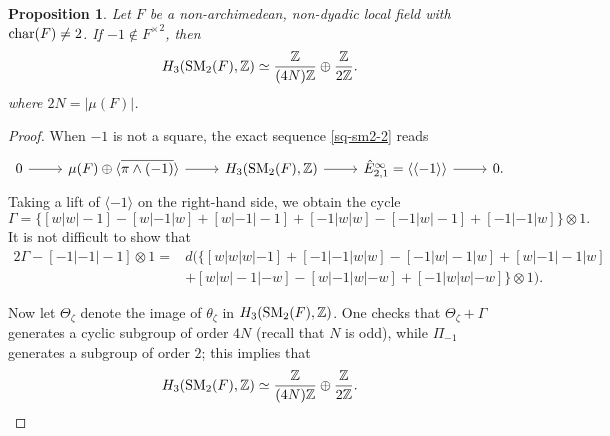 \documentclass[11pt]{amsart}
\theoremstyle{definition}
\theoremstyle{plain}
\newtheorem{prp}[ntn]{Proposition}
\theoremstyle{definition}
\numberwithin{equation}{section}
\newcommand{\z}{\mathbb{Z}}
\newcommand{\lan}{\langle}
\newcommand{\ran}{\rangle}
\newcommand{\SM}{\mathit{{\rm SM}}}
\renewcommand{\char}{{\rm char}}
\begin{document}
	\begin{prp}
		Let $F$ be a non-archimedean, non-dyadic local field with $\char(F)\neq 2$. If $-1\notin{F^\times}^2$, then
		\[
		H_3(\SM_2(F),\z)\simeq \frac{\z}{(4N)\z}\oplus\frac{\z}{2\z}. 
		\]
		where $2N=|\mu(F)|$.
	\end{prp}
	\begin{proof}
		When $-1$ is not a square, the exact sequence \eqref{sq-sm2-2} reads
		\[
		\begin{tikzcd}
			0 \ar[r]& \mu(F)\oplus\lan\overline{\pi\wedge(-1)}\ran\ar[r] & H_3(\SM_2(F),\z)\ar[r] & \hat{E}^{\infty}_{2,1}=\lan\lan -1\ran\ran\ar[r] & 0.
		\end{tikzcd}
		\]
		Taking a lift of $\lan -1\ran$ on the right-hand side, we obtain the cycle
		\[
		\Gamma = \{[w|w|-1]-[w|-1|w]+[w|-1|-1]+[-1|w|w]-[-1|w|-1]+[-1|-1|w]\}\otimes 1.
		\]
		It is not difficult to show that
		\begin{align*}
			2\Gamma-[-1|-1|-1]\otimes 1=&d\big(\{[w|w|w|-1]+[-1|-1|w|w]-[-1|w|-1|w]+[w|-1|-1|w]\\
			&+[w|w|-1|-w]-[w|-1|w|-w]+[-1|w|w|-w]\}\otimes 1\big).
		\end{align*}
		
		Now let $\Theta_\zeta$ denote the image of $\theta_{\zeta}$ in $H_3(\SM_2(F),\z)$. One checks that $\Theta_{\zeta}+\Gamma$ generates a cyclic subgroup of order $4N$ (recall that $N$ is odd), while $\Pi_{-1}$ generates a subgroup of order $2$; this implies that
		\[
		H_3(\SM_2(F),\z)\simeq\frac{\z}{(4N)\z}\oplus\frac{\z}{2\z}.
		\]
	\end{proof}
	
\end{document}
